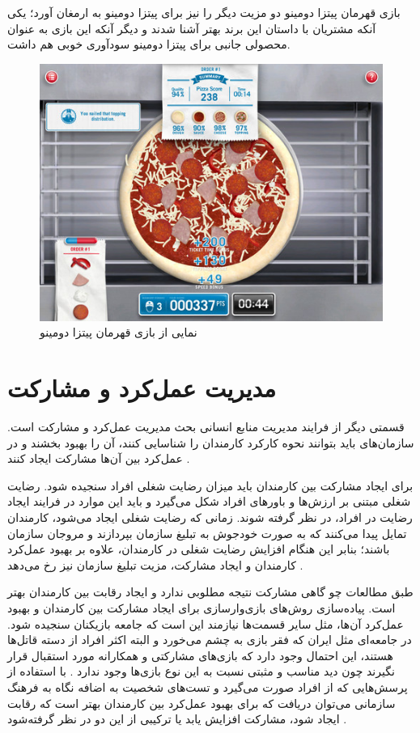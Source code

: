 بازی قهرمان پیتزا دومینو دو مزیت دیگر را نیز برای پیتزا دومینو به ارمغان آورد‌؛ یکی آنکه مشتریان با داستان این برند بهتر آشنا شدند و دیگر آنکه این بازی به عنوان محصولی جانبی برای پیتزا دومینو سودآوری خوبی هم داشت.
\begin{figure}[!htb]
	\centering
	\includegraphics[width=\textwidth]{Figures/domino.png}
	\caption{نمایی از بازی قهرمان پیتزا دومینو \cite{domino}}
\end{figure}

\section{مدیریت عمل‌کرد و مشارکت}
قسمتی دیگر از فرایند مدیریت منابع انسانی بحث مدیریت عمل‌کرد و مشارکت است. سازمان‌های باید بتوانند نحوه کارکرد کارمندان را شناسایی کنند، آن را بهبود بخشند و در عمل‌کرد بین آن‌ها مشارکت ایجاد کنند \cite{review}.

برای ایجاد مشارکت بین کارمندان باید میزان رضایت شغلی افراد سنجیده شود. رضایت شغلی مبتنی بر ارزش‌ها و باورهای افراد شکل می‌گیرد و باید این موارد در فرایند ایجاد رضایت در افراد، در نظر گرفته شوند. زمانی که رضایت شغلی ایجاد می‌شود، کارمندان تمایل پیدا می‌کنند که به صورت خودجوش به تبلیغ سازمان بپردازند و مروجان سازمان باشند؛ بنابر این هنگام افزایش رضایت شغلی در کارمندان، علاوه بر بهبود عمل‌کرد کارمندان و ایجاد مشارکت، مزیت تبلیغ سازمان نیز رخ می‌دهد \cite{rezayat}.

طبق مطالعات چو \cite{actionable} گاهی مشارکت نتیجه مطلوبی ندارد و ایجاد رقابت بین کارمندان بهتر است. پیاده‌سازی روش‌های بازی‌وارسازی برای ایجاد مشارکت بین کارمندان و بهبود عمل‌کرد آن‌ها، مثل سایر قسمت‌ها نیازمند این است که جامعه بازیکنان سنجیده شود. در جامعه‌ای مثل ایران که فقر بازی به چشم می‌خورد و البته اکثر افراد از دسته قاتل‌ها هستند، این احتمال وجود دارد که بازی‌های مشارکتی و همکارانه مورد استقبال قرار نگیرند چون دید مناسب و مثبتی نسبت به این نوع بازی‌ها وجود ندارد \cite{atoz}. با استفاده از پرسش‌هایی که از افراد صورت می‌گیرد و تست‌های شخصیت به اضافه نگاه به فرهنگ سازمانی می‌توان دریافت که برای بهبود عمل‌کرد بین کارمندان بهتر است که رقابت ایجاد شود، مشارکت افزایش یابد یا ترکیبی از این دو در نظر گرفته‌شود \cite{reghmosh}.

